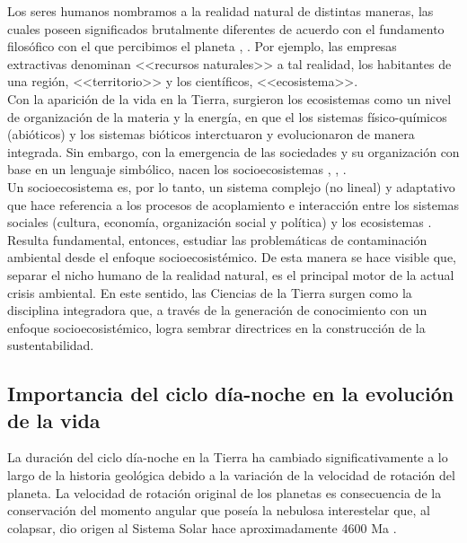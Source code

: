 Los seres humanos nombramos a la realidad natural de distintas maneras, las cuales poseen significados brutalmente diferentes de acuerdo con el fundamento filosófico con el que percibimos el planeta \citep{Avila2019}, \citep{Uribe2014}. Por ejemplo, las empresas extractivas denominan <<recursos naturales>> a tal realidad, los habitantes de una región, <<territorio>> y los científicos, <<ecosistema>>.\\

Con la aparición de la vida en la Tierra, surgieron los ecosistemas como un nivel de organización de la materia y la energía, en que el los sistemas físico-químicos (abióticos) y los sistemas bióticos interctuaron y evolucionaron de manera integrada. Sin embargo, con la emergencia de las sociedades y su organización con base en un lenguaje simbólico, nacen los socioecosistemas \citep{Avila2019}, \citep{Uribe2014}, \citep{Urquiza2015}.\\

Un socioecosistema es, por lo tanto, un sistema complejo (no lineal) y adaptativo que hace referencia a los procesos de acoplamiento e interacción entre los sistemas sociales (cultura, economía, organización social y política) y los ecosistemas \citep{Urquiza2015}.\\

Resulta fundamental, entonces, estudiar las problemáticas de contaminación ambiental desde el enfoque socioecosistémico. De esta manera se hace visible que, separar el nicho humano de la realidad natural, es el principal motor de la actual crisis ambiental. En este sentido, las Ciencias de la Tierra surgen como la disciplina integradora que, a través de la generación de conocimiento con un enfoque socioecosistémico, logra sembrar directrices en la construcción de la sustentabilidad.\\

\subsection{Importancia del ciclo día-noche en la evolución de la vida}

La duración del ciclo día-noche en la Tierra ha cambiado significativamente a lo largo de la historia geológica debido a la variación de la velocidad de rotación del planeta. La velocidad de rotación original de los planetas  es consecuencia de la conservación del momento angular que poseía la nebulosa interestelar que, al colapsar, dio origen al Sistema Solar hace aproximadamente 4600 Ma \citep{Greaves2005}.\\

